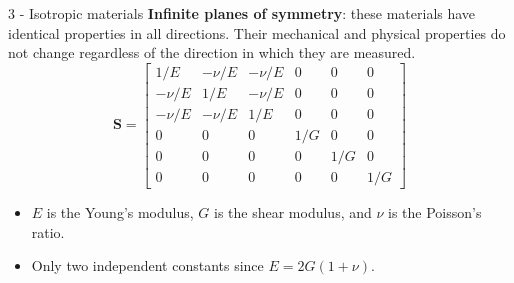 \documentclass[aspectratio=169]{beamer}
\begin{document}
\begin{frame}{3 - Isotropic materials}
  \textbf{Infinite planes of symmetry}: these materials have identical properties in all directions. Their mechanical and physical properties do not change regardless of the direction in which they are measured.
  \vspace{0.2cm}
  {\small $$\mathbf S=\begin{bmatrix} 1/E & -\nu/E & -\nu/E & 0 & 0 & 0 \\  -\nu/E & 1/E  & -\nu/E  & 0 & 0 & 0 \\ -\nu/E & -\nu/E & 1/E & 0 & 0 & 0 \\ 0 & 0 & 0 & 1/G & 0 & 0 \\ 0 & 0 & 0 & 0 & 1/G & 0 \\ 0 & 0 & 0 & 0 & 0 & 1/G \end{bmatrix}$$}
  \begin{itemize}
    \item $E$ is the Young's modulus, $G$ is the shear modulus, and $\nu$ is the Poisson's ratio.
    \item Only two independent constants since $E=2G(1+\nu)$.
  \end{itemize}
\end{frame}
\end{document}
